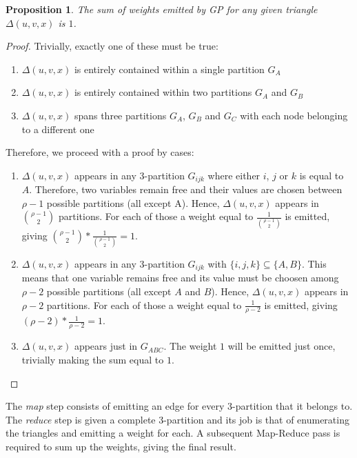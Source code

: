 \documentclass[paper=a4, fontsize=11pt]{scrartcl}
\newtheorem{proposition}{Proposition}
\numberwithin{equation}{section}
\numberwithin{figure}{section}
\numberwithin{table}{section}
\begin{document}
\begin{proposition}
    The sum of weights emitted by GP for any given triangle $\Delta(u, v, x)$ is $1$.
\end{proposition}
\begin{proof}
    Trivially, exactly one of these must be true:
    \begin{enumerate}
        \item $\Delta(u, v, x)$ is entirely contained within a single partition $G_A$
        \item $\Delta(u, v, x)$ is entirely contained within two partitions $G_A$ and $G_B$
        \item $\Delta(u, v, x)$ spans three partitions $G_A$, $G_B$ and $G_C$
        with each node belonging to a different one
    \end{enumerate}
    Therefore, we proceed with a proof by cases:
    \begin{enumerate}
        \item $\Delta(u, v, x)$ appears in any 3-partition $G_{ijk}$ where
        either $i$, $j$ or $k$ is equal to $A$. Therefore, two variables remain
        free and their values are chosen between $\rho-1$ possible partitions
        (all except A). Hence, $\Delta(u, v, x)$ appears in $\binom{\rho-1}{2}$
        partitions. For each of those a weight equal to
        $\frac{1}{\binom{\rho-1}{2}}$ is emitted, giving
        $\binom{\rho-1}{2}*\frac{1}{\binom{\rho-1}{2}}=1$.

        \item $\Delta(u, v, x)$ appears in any 3-partition $G_{ijk}$ with $\{i,
        j, k\} \subseteq \{A, B\}$. This means that one variable remains free
        and its value must be choosen among $\rho-2$ possible partitions (all
        except $A$ and $B$). Hence, $\Delta(u, v, x)$ appears in $\rho-2$
        partitions. For each of those a weight equal to $\frac{1}{\rho-2}$ is
        emitted, giving $(\rho-2)*\frac{1}{\rho-2}=1$.

        \item $\Delta(u, v, x)$ appears just in $G_{ABC}$. The weight $1$ will
        be emitted just once, trivially making the sum equal to $1$.
    \end{enumerate}
\end{proof}

The \emph{map} step consists of emitting an edge for every 3-partition that it
belongs to. The \emph{reduce} step is given a complete 3-partition and its job
is that of enumerating the triangles and emitting a weight for each. A
subsequent Map-Reduce pass is required to sum up the weights, giving the final
result.
\end{document}
